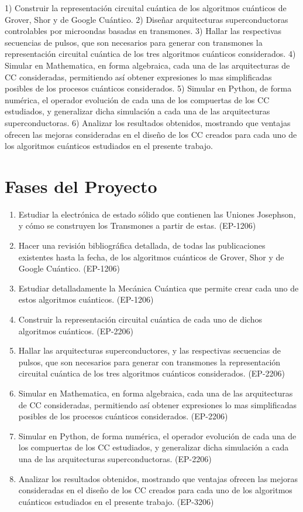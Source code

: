 1) Construir la representación circuital cuántica de los algoritmos cuánticos de Grover, Shor y de Google Cuántico.
2) Diseñar arquitecturas superconductoras controlables por microondas basadas en transmones.
3) Hallar las respectivas secuencias de pulsos, que son necesarios para generar con transmones la
representación circuital cuántica de los tres algoritmos cuánticos considerados.
4) Simular en Mathematica, en forma algebraica, cada una de las arquitecturas de CC consideradas,
permitiendo así obtener expresiones lo mas simplificadas posibles de los procesos cuánticos considerados.
5) Simular en Python, de forma numérica, el operador evolución de cada una de los compuertas de los CC
estudiados, y generalizar dicha simulación a cada una de las arquitecturas superconductoras.
6) Analizar los resultados obtenidos, mostrando que ventajas ofrecen las mejoras consideradas en el
diseño de los CC creados para cada uno de los algoritmos cuánticos estudiados en el presente trabajo.

\section{Fases del Proyecto}

\begin{enumerate}
    \item Estudiar la electrónica de estado sólido que contienen las Uniones Josephson, y cómo se construyen los Transmones a partir de estas. (EP-1206)
    \item Hacer una revisión bibliográfica detallada, de todas las publicaciones existentes hasta la fecha, de los algoritmos cuánticos de Grover, Shor y de Google Cuántico. (EP-1206)
    \item Estudiar detalladamente la Mecánica Cuántica que permite crear cada uno de estos algoritmos cuánticos. (EP-1206)
    \item Construir la representación circuital cuántica de cada uno de dichos algoritmos cuánticos. (EP-2206)
    \item Hallar las arquitecturas superconductores, y las respectivas secuencias de pulsos, que son necesarios para generar con transmones la representación circuital cuántica de los tres algoritmos cuánticos considerados. (EP-2206)
    \item Simular en Mathematica, en forma algebraica, cada una de las arquitecturas de CC consideradas, permitiendo así obtener expresiones lo mas simplificadas posibles de los procesos cuánticos considerados. (EP-2206)
    \item Simular en Python, de forma numérica, el operador evolución de cada una de los compuertas de los CC estudiados, y generalizar dicha simulación a cada una de las arquitecturas superconductoras. (EP-2206)
    \item Analizar los resultados obtenidos, mostrando que ventajas ofrecen las mejoras consideradas en el diseño de los CC creados para cada uno de los algoritmos cuánticos estudiados en el presente trabajo. (EP-3206)
\end{enumerate}


